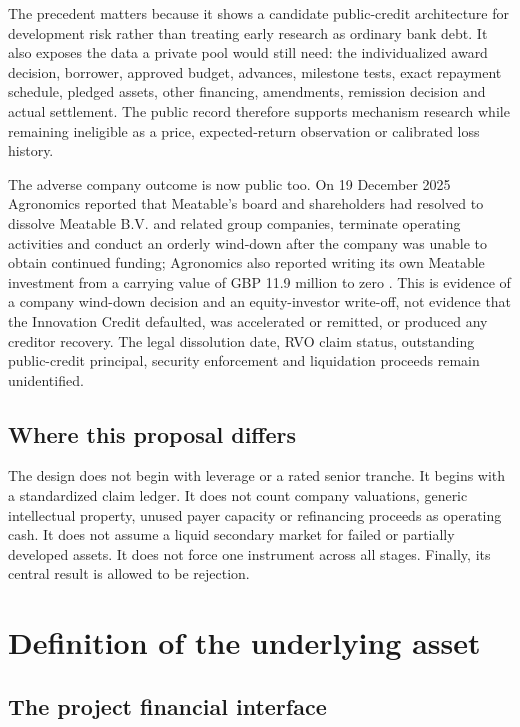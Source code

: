 \documentclass[11pt,a4paper]{article}
\begin{document}
The precedent matters because it shows a candidate public-credit architecture for development risk rather than treating early research as ordinary bank debt. It also exposes the data a private pool would still need: the individualized award decision, borrower, approved budget, advances, milestone tests, exact repayment schedule, pledged assets, other financing, amendments, remission decision and actual settlement. The public record therefore supports mechanism research while remaining ineligible as a price, expected-return observation or calibrated loss history.

The adverse company outcome is now public too. On 19 December 2025 Agronomics reported that Meatable's board and shareholders had resolved to dissolve Meatable B.V. and related group companies, terminate operating activities and conduct an orderly wind-down after the company was unable to obtain continued funding; Agronomics also reported writing its own Meatable investment from a carrying value of GBP 11.9 million to zero \citep{agronomics2025meatabledissolution}. This is evidence of a company wind-down decision and an equity-investor write-off, not evidence that the Innovation Credit defaulted, was accelerated or remitted, or produced any creditor recovery. The legal dissolution date, RVO claim status, outstanding public-credit principal, security enforcement and liquidation proceeds remain unidentified.

\subsection{Where this proposal differs}

The design does not begin with leverage or a rated senior tranche. It begins with a standardized claim ledger. It does not count company valuations, generic intellectual property, unused payer capacity or refinancing proceeds as operating cash. It does not assume a liquid secondary market for failed or partially developed assets. It does not force one instrument across all stages. Finally, its central result is allowed to be rejection.

\section{Definition of the underlying asset}

\subsection{The project financial interface}
\end{document}
